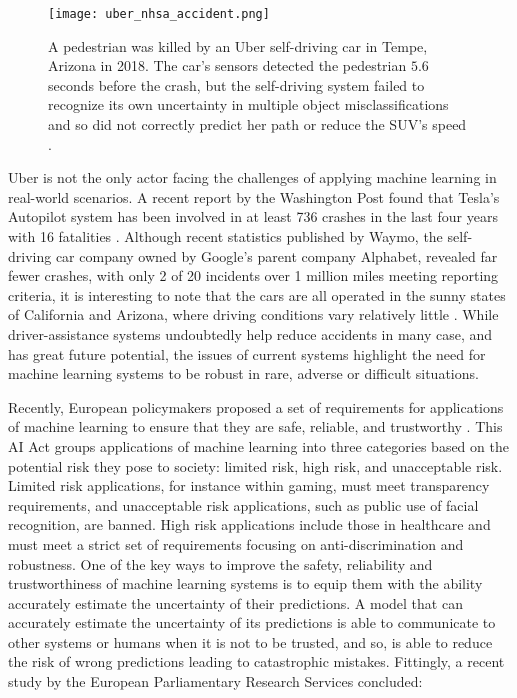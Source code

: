 \begin{figure}[t]
    \centering
    \texttt{[image: uber\_nhsa\_accident.png]}
    \caption{A pedestrian was killed by an Uber self-driving car in Tempe, Arizona in 2018. The car's sensors detected the pedestrian $5.6$ seconds before the crash, but the self-driving system failed to recognize its own uncertainty in multiple object misclassifications and so did not correctly predict her path or reduce the SUV's speed \cite{nationaltransportationsafetyboardnhsa_collision_2019}.}
    \label{fig:uber_nhsa_accident}
\end{figure}

Uber is not the only actor facing the challenges of applying machine learning in real-world scenarios. A recent report by the Washington Post found that Tesla's Autopilot system has been involved in at least 736 crashes in the last four years with 16 fatalities \cite{siddiqui_17_2023}. 
Although recent statistics published by Waymo, the self-driving car company owned by Google's parent company Alphabet, revealed far fewer crashes, with only 2 of 20 incidents over 1 million miles meeting reporting criteria, it is interesting to note that the cars are all operated in the sunny states of California and Arizona, where driving conditions vary relatively little \cite{hawkins_waymo_2023}. 
While driver-assistance systems undoubtedly help reduce accidents in many case, and has great future potential, the issues of current systems highlight the need for machine learning systems to be robust in rare, adverse or difficult situations. 

Recently, European policymakers proposed a set of requirements for applications of machine learning to ensure that they are safe, reliable, and trustworthy \cite{europeancommission_briefing_2021}. This AI Act groups applications of machine learning into three categories based on the potential risk they pose to society: limited risk, high risk, and unacceptable risk. Limited risk applications, for instance within gaming, must meet transparency requirements, and unacceptable risk applications, such as public use of facial recognition, are banned. High risk applications include those in healthcare and must meet a strict set of requirements focusing on anti-discrimination and robustness. 
%
One of the key ways to improve the safety, reliability and trustworthiness of machine learning systems is to equip them with the ability accurately estimate the uncertainty of their predictions. 
A model that can accurately estimate the uncertainty of its predictions is able to communicate to other systems or humans when it is not to be trusted, and so, is able to reduce the risk of wrong predictions leading to catastrophic mistakes. 
Fittingly, a recent study by the European Parliamentary Research Services concluded: 

